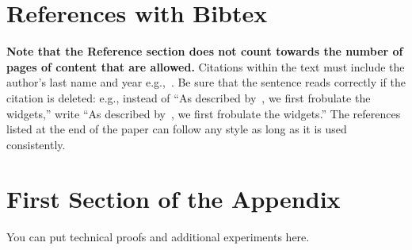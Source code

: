 \documentclass{article}
\begin{document}




\section*{References with Bibtex}
{\bf Note that the Reference section does not count towards the number of pages of content that are allowed.}
Citations within the text must include the author's last name and year e.g.,~\citep{MachineLearningI}. Be sure that the sentence reads correctly if the citation is deleted: e.g., instead of “As described by~\citep{DudaHart2nd}, we first frobulate the widgets,” write “As described by~\citet{DudaHart2nd}, we first frobulate the widgets.” The references listed at the end of the paper can follow any style as long as it is used consistently.





\appendix 
\section{First Section of the Appendix}
You can put technical proofs and additional experiments here.
\end{document}
